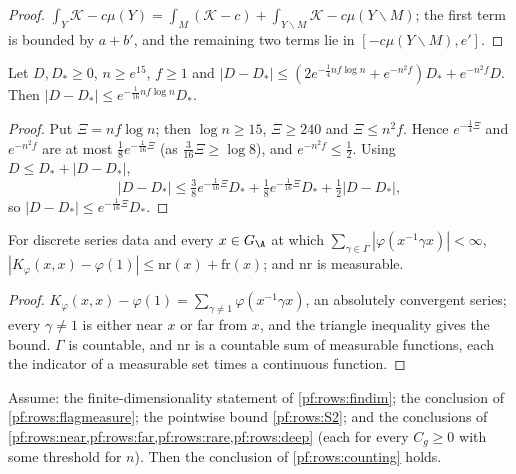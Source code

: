 \begin{proof}
$\int_Y\mathcal K-c\mu(Y)=\int_M(\mathcal K-c)+\int_{Y\smallsetminus M}\mathcal K-c\mu(Y\smallsetminus M)$; the first term is bounded by
$a+b'$, and the remaining two terms lie in $[-c\mu(Y\smallsetminus M),e']$.
\end{proof}

\begin{lemma}\label{pf:rows:numerics}
Let $D,D_*\ge0$, $n\ge e^{15}$, $f\ge1$ and
$|D-D_*|\le(2e^{-\frac14nf\log n}+e^{-n^2f})D_*+e^{-n^2f}D$. Then $|D-D_*|\le e^{-\frac1{16}nf\log n}D_*$.
\end{lemma}

\begin{proof}
Put $\Xi=nf\log n$; then $\log n\ge15$, $\Xi\ge240$ and $\Xi\le n^2f$. Hence $e^{-\frac14\Xi}$ and $e^{-n^2f}$ are at most
$\frac18e^{-\frac1{16}\Xi}$ (as $\frac3{16}\Xi\ge\log8$), and $e^{-n^2f}\le\frac12$. Using $D\le D_*+|D-D_*|$,
\[
|D-D_*|\le\tfrac38e^{-\frac1{16}\Xi}D_*+\tfrac18e^{-\frac1{16}\Xi}D_*+\tfrac12|D-D_*|,
\]
so $|D-D_*|\le e^{-\frac1{16}\Xi}D_*$.
\end{proof}

\begin{lemma}\label{pf:rows:pointsplit}
For discrete series data and every $x\in\rowsGA$ at which $\sum_{\gamma\in\Gamma}|\varphi(x^{-1}\gamma x)|<\infty$,
$|K_\varphi(x,x)-\varphi(1)|\le\mathrm{nr}(x)+\mathrm{fr}(x)$; and $\mathrm{nr}$ is measurable.
\end{lemma}

\begin{proof}
$K_\varphi(x,x)-\varphi(1)=\sum_{\gamma\ne1}\varphi(x^{-1}\gamma x)$, an absolutely convergent series; every $\gamma\ne1$ is either near
$x$ or far from $x$, and the triangle inequality gives the bound. $\Gamma$ is countable, and $\mathrm{nr}$ is a countable sum of
measurable functions, each the indicator of a measurable set times a continuous function.
\end{proof}

\begin{lemma}[Assembly]\label{pf:rows:assembly}
Assume: the finite-dimensionality statement of \cref{pf:rows:findim}; the conclusion of \cref{pf:rows:flagmeasure}; the
pointwise bound \ref{pf:rows:S2}; and the conclusions of \cref{pf:rows:near,pf:rows:far,pf:rows:rare,pf:rows:deep} (each
for every $C_g\ge0$ with some threshold for $n$). Then the conclusion of \cref{pf:rows:counting} holds.
\end{lemma}

